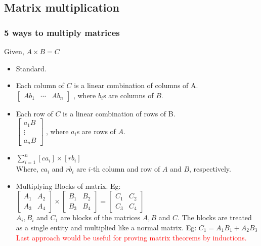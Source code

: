 \subsection{Matrix multiplication}

\subsubsection{5 ways to multiply matrices}

Given, $A \times B = C$\\

\begin{itemize}
\item Standard.
\item Each column of $C$ is a linear combination of columns of A.\\
	$\begin{bmatrix}
		Ab_1 & \cdots & A b_n 
	\end{bmatrix}$
	, where $b_i$s are columns of $B$. 
\item Each row of $C$ is a linear combination of rows of B.\\
	$\begin{bmatrix}
		a_1B\\
		\vdots\\
		a_nB
	\end{bmatrix}$
	, where $a_i$s are rows of $A$.
\item $\sum_{i=1}^{n} [ca_i] \times [rb_i]$\\
Where, $ca_i$ and $rb_i$ are $i$-th column and row of $A$ and $B$, respectively.
\item Multiplying Blocks of matrix. Eg:\\
	$
	\begin{bmatrix}
		A_1 & A_2\\
		A_3 & A_4
	\end{bmatrix}	
	\times
	\begin{bmatrix}
		B_1 & B_2\\
		B_3 & B_4
	\end{bmatrix}	
	=
	\begin{bmatrix}
		C_1 & C_2\\
		C_3 & C_4
	\end{bmatrix}	
	$\\
$A_i, B_i$ and $C_1$ are blocks of the matrices $A, B$ and $C$. The blocks are treated as a single entity and multiplied like a normal matrix. Eg:
$C_1 = A_1B_1 + A_2B_3$\\
\textcolor{red}{Last approach would be useful for proving matrix theorems by inductions.}
\end{itemize}

